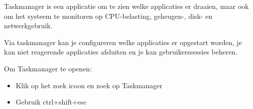 Taskmanager is een applicatie om te zien welke applicaties er draaien, maar ook om het systeem te monitoren op CPU-belasting, geheugen-, disk- en netwerkgebruik.

Via taskmanager kan je configureren welke applicaties er opgestart worden, je kan niet reagerende applicaties afsluiten en je kan gebruikerssessies beheren.

Om Taskmanager te openen:
\begin{itemize}
\item Klik op het zoek icoon en zoek op Taskmanager
\item Gebruik ctrl+shift+esc
\end{itemize}

\begin{minipage}[t]{\linewidth}
\raggedright
{}
\end{minipage}

